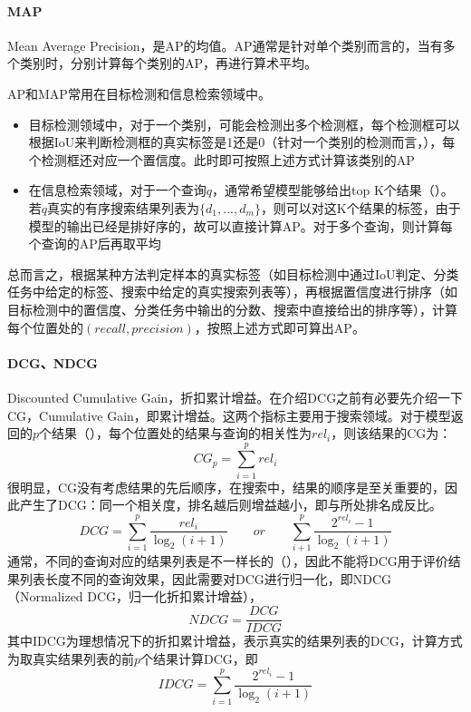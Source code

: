 \paragraph{MAP}
Mean Average Precision，是AP的均值。AP通常是针对单个类别而言的，当有多个类别时，分别计算每个类别的AP，再进行算术平均。

AP和MAP常用在目标检测和信息检索领域中。
\begin{itemize}
	\item 目标检测领域中，对于一个类别，可能会检测出多个检测框，每个检测框可以根据IoU来判断检测框的真实标签是1还是0（针对一个类别的检测而言，），每个检测框还对应一个置信度。此时即可按照上述方式计算该类别的AP
	\item 在信息检索领域，对于一个查询$q$，通常希望模型能够给出top K个结果（）。若$q$真实的有序搜索结果列表为$\{d_1, ..., d_m\}$，则可以对这K个结果的标签，由于模型的输出已经是排好序的，故可以直接计算AP。对于多个查询，则计算每个查询的AP后再取平均
\end{itemize}
总而言之，根据某种方法判定样本的真实标签（如目标检测中通过IoU判定、分类任务中给定的标签、搜索中给定的真实搜索列表等），再根据置信度进行排序（如目标检测中的置信度、分类任务中输出的分数、搜索中直接给出的排序等），计算每个位置处的$(recall, precision)$，按照上述方式即可算出AP。


\paragraph{DCG、NDCG}
Discounted Cumulative Gain，折扣累计增益。在介绍DCG之前有必要先介绍一下CG，Cumulative Gain，即累计增益。这两个指标主要用于搜索领域。对于模型返回的$p$个结果（），每个位置处的结果与查询的相关性为$rel_i$，则该结果的CG为：
$$
CG_p = \sum_{i=1}^p rel_i
$$
很明显，CG没有考虑结果的先后顺序，在搜索中，结果的顺序是至关重要的，因此产生了DCG：同一个相关度，排名越后则增益越小，即与所处排名成反比。
$$
DCG = \sum_{i=1}^p \frac{rel_i}{\log_2(i+1)}\qquad or\qquad \sum_{i+1}^p \frac{2^{rel_i} - 1}{\log_2(i+1)}
$$
通常，不同的查询对应的结果列表是不一样长的（），因此不能将DCG用于评价结果列表长度不同的查询效果，因此需要对DCG进行归一化，即NDCG（Normalized DCG，归一化折扣累计增益），
$$
NDCG = \frac{DCG}{IDCG}
$$
其中IDCG为理想情况下的折扣累计增益，表示真实的结果列表的DCG，计算方式为取真实结果列表的前$p$个结果计算DCG，即
$$
IDCG = \sum_{i=1}^p \frac{2^{rel_i} - 1}{\log_2(i+1)}
$$

